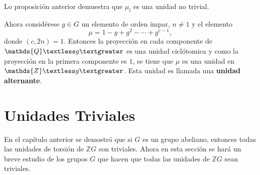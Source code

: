 \begin{nota}
Lo proposición anterior demuestra que $\mu_l$ es una unidad no trivial.
\end{nota}
\begin{ejemplo}
Ahora considérese $g \in G$ un elemento de orden impar, $n \neq 1$ y el elemento \[ \mu = 1-g+g^2-\cdots +g^{c-1},\] donde $(c,2n)=1$. Entonces la proyección en cada componente de $\mathds{Q}\textless g \textgreater$ es una unidad ciclótomica y como la proyección en la primera componente es $1$, se tiene que $\mu$ es una unidad en $\mathds{Z}\textless g \textgreater$. Esta unidad es llamada una \textbf{unidad alternante}.
\end{ejemplo}

\section{\quad Unidades Triviales}
En el capítulo anterior se demostró que si $G$ es un grupo abeliano, entonces todas las unidades de torsión de $\mathds{Z}G$ son triviales. Ahora en esta sección se hará un breve estudio de los grupos $G$ que hacen que todas las unidades de $\mathds{Z}G$ sean triviales.

